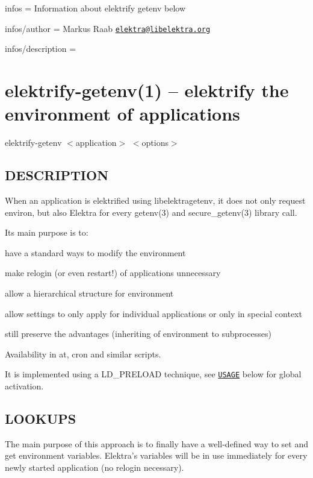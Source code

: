
\begin{DoxyItemize}
\item infos = Information about elektrify getenv below
\item infos/author = Markus Raab \href{mailto:elektra@libelektra.org}{\tt elektra@libelektra.\+org}
\item infos/description =
\end{DoxyItemize}

\section*{elektrify-\/getenv(1) -- elektrify the environment of applications }

{\ttfamily elektrify-\/getenv} $<$application$>$ $<$options$>$

\subsection*{D\+E\+S\+C\+R\+I\+P\+T\+I\+O\+N}

When an application is elektrified using libelektragetenv, it does not only request {\ttfamily environ}, but also Elektra for every getenv(3) and secure\+\_\+getenv(3) library call.

Its main purpose is to\+:


\begin{DoxyItemize}
\item have a standard ways to modify the environment
\item make relogin (or even restart!) of applications unnecessary
\item allow a hierarchical structure for environment
\item allow settings to only apply for individual applications or only in special context
\item still preserve the advantages (inheriting of environment to subprocesses)
\item Availability in at, cron and similar scripts.
\end{DoxyItemize}

It is implemented using a L\+D\+\_\+\+P\+R\+E\+L\+O\+A\+D technique, see \href{#USAGE}{\tt U\+S\+A\+G\+E} below for global activation.

\subsection*{L\+O\+O\+K\+U\+P\+S}

The main purpose of this approach is to finally have a well-\/defined way to set and get environment variables. Elektra's variables will be in use immediately for every newly started application (no relogin necessary).


